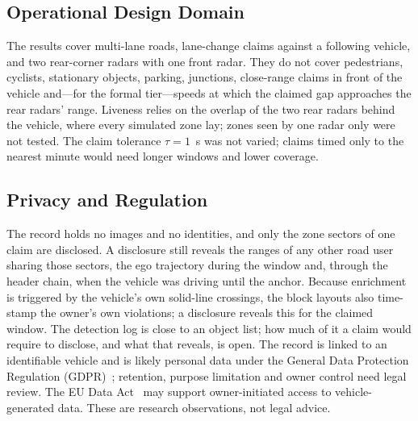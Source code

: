\subsection{Operational Design Domain}
The results cover multi-lane roads, lane-change claims against a following vehicle, and two rear-corner radars with one front radar. They do not cover pedestrians, cyclists, stationary objects, parking, junctions, close-range claims in front of the vehicle and---for the formal tier---speeds at which the claimed gap approaches the rear radars' range. Liveness relies on the overlap of the two rear radars behind the vehicle, where every simulated zone lay; zones seen by one radar only were not tested. The claim tolerance $\tau = 1$~s was not varied; claims timed only to the nearest minute would need longer windows and lower coverage.

\subsection{Privacy and Regulation}\label{sec:privacy}
The record holds no images and no identities, and only the zone sectors of one claim are disclosed. A disclosure still reveals the ranges of any other road user sharing those sectors, the ego trajectory during the window and, through the header chain, when the vehicle was driving until the anchor. Because enrichment is triggered by the vehicle's own solid-line crossings, the block layouts also time-stamp the owner's own violations; a disclosure reveals this for the claimed window. The detection log is close to an object list; how much of it a claim would require to disclose, and what that reveals, is open. The record is linked to an identifiable vehicle and is likely personal data under the General Data Protection Regulation (GDPR)~\cite{b54}; retention, purpose limitation and owner control need legal review. The EU Data Act~\cite{b55} may support owner-initiated access to vehicle-generated data. These are research observations, not legal advice.

